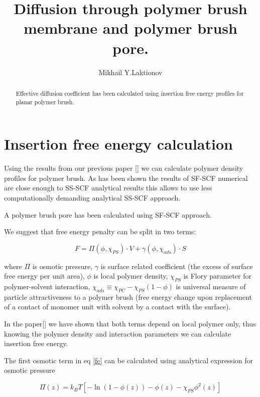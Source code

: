 \documentclass[12pt,a4paper]{article}
\begin{document}
\title{Diffusion through polymer brush membrane and polymer brush pore.}

\author{Mikhail Y.Laktionov}

\maketitle

\begin{abstract}
Effective diffusion coefficient has been calculated using insertion free energy profiles for planar polymer brush.
\end{abstract}

\section{Insertion free energy calculation}

Using the results from our previous paper [] we can calculate polymer density profiles for polymer brush. 
As has been shown the results of SF-SCF numerical are close enough to SS-SCF analytical results this allows to use less computationally demanding analytical SS-SCF approach.

A polymer brush pore has been calculated using SF-SCF approach.

We suggest that free energy penalty can be split in two terms:

\begin{equation}
    F = \Pi(\phi, \chi_{PS}) \cdot V + \gamma(\phi, \chi_{ads}) \cdot S
    \label{fe}
\end{equation}

where $\Pi$ is osmotic pressure,
$\gamma$ is surface related coefficient (the excess of surface free energy per unit area),
$\phi$ is local polymer density,
$\chi_{PS}$ is Flory parameter for polymer-solvent interaction,
$\chi_{ads} \equiv \chi_{PC} - \chi_{PS}(1-\phi)$ is universal measure of particle attractiveness to a polymer brush (free energy change upon replacement of a contact of monomer unit with solvent by a contact with the surface).

In the paper[] we have shown that both terms depend on local polymer only, thus knowing the polymer density and interaction parameters we can calculate insertion free energy. 

The first osmotic term in eq \ref{fe} can be calculated using analytical expression for osmotic pressure

\begin{equation}
	\Pi(z)= k_BT[-\ln(1-\phi(z)) - \phi(z) -\chi_{PS}\phi^2(z)]
	\label{pi}
\end{equation}
\end{document}
